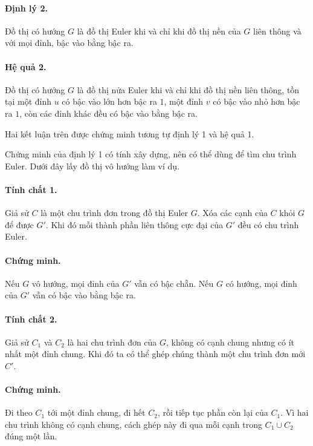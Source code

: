 \documentclass[11pt]{article}
\begin{document}
\paragraph{Định lý 2.}
Đồ thị có hướng \(G\) là đồ thị Euler khi và chỉ khi đồ thị nền của \(G\) liên
thông và với mọi đỉnh, bậc vào bằng bậc ra.

\paragraph{Hệ quả 2.}
Đồ thị có hướng \(G\) là đồ thị nửa Euler khi và chỉ khi đồ thị nền liên
thông, tồn tại một đỉnh \(u\) có bậc vào lớn hơn bậc ra \(1\), một đỉnh \(v\)
có bậc vào nhỏ hơn bậc ra \(1\), còn các đỉnh khác đều có bậc vào bằng bậc ra.

Hai kết luận trên được chứng minh tương tự định lý 1 và hệ quả 1.

Chứng minh của định lý 1 có tính xây dựng, nên có thể dùng để tìm chu trình
Euler. Dưới đây lấy đồ thị vô hướng làm ví dụ.

\paragraph{Tính chất 1.}
Giả sử \(C\) là một chu trình đơn trong đồ thị Euler \(G\). Xóa các cạnh của
\(C\) khỏi \(G\) để được \(G'\). Khi đó mỗi thành phần liên thông cực đại của
\(G'\) đều có chu trình Euler.

\paragraph{Chứng minh.}
Nếu \(G\) vô hướng, mọi đỉnh của \(G'\) vẫn có bậc chẵn. Nếu \(G\) có hướng,
mọi đỉnh của \(G'\) vẫn có bậc vào bằng bậc ra.

\paragraph{Tính chất 2.}
Giả sử \(C_1\) và \(C_2\) là hai chu trình đơn của \(G\), không có cạnh chung
nhưng có ít nhất một đỉnh chung. Khi đó ta có thể ghép chúng thành một chu
trình đơn mới \(C'\).

\paragraph{Chứng minh.}
Đi theo \(C_1\) tới một đỉnh chung, đi hết \(C_2\), rồi tiếp tục phần còn lại
của \(C_1\). Vì hai chu trình không có cạnh chung, cách ghép này đi qua mỗi
cạnh trong \(C_1\cup C_2\) đúng một lần.
\end{document}
